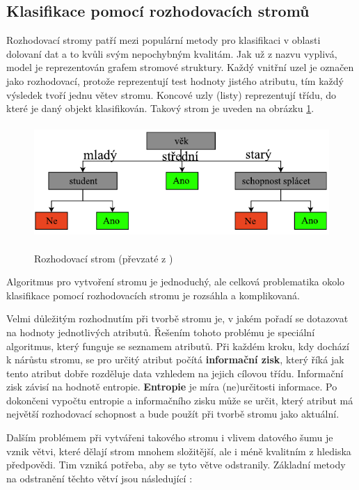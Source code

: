 \subsection*{Klasifikace pomocí rozhodovacích stromů}
Rozhodovací stromy patří mezi populární metody pro klasifikaci v oblasti dolovaní dat a to kvůli svým nepochybným kvalitám. Jak už z nazvu vyplivá, model je reprezentován grafem stromové struktury. Každý vnitřní uzel je označen jako rozhodovací, protože reprezentují test hodnoty jistého atributu, tím každý výsledek tvoří jednu větev stromu. Koncové uzly (listy) reprezentují třídu, do které je daný objekt klasifikován. \cite{Lior} Takový strom je uveden na obrázku \ref{strom_df}.

\begin{figure}[h]\centering
  \centering
  \includegraphics[width=5in,height=1.7in]{obrazky/rozhodovaci-strom.pdf}\\[1pt]
  \caption{Rozhodovací strom (převzaté z \cite{Han})}
  \label{strom_df}
\end{figure}

Algoritmus pro vytvoření stromu je jednoduchý, ale celková problematika okolo klasifikace pomocí rozhodovacích stromu je rozsáhla a komplikovaná.

Velmi důležitým rozhodnutím při tvorbě stromu je, v jakém pořadí se dotazovat na hodnoty jednotlivých atributů. Řešením tohoto problému je speciální algoritmus, který funguje se seznamem atributů. Při každém kroku, kdy dochází k nárůstu stromu, se pro určitý atribut počítá \textbf{informační zisk}, který říká jak tento atribut dobře rozděluje data vzhledem na jejich cílovou třídu. Informační zisk závisí na hodnotě entropie. \textbf{Entropie} je míra (ne)určitosti informace. Po dokončeni vypočtu entropie a informačního zisku může se určit, který atribut má největší rozhodovací schopnost a bude použít při tvorbě stromu jako aktuální. \cite{Dunham}

Dalším problémem při vytvářeni takového stromu i vlivem datového šumu je vznik větvi, které dělají strom mnohem složitější, ale i méně kvalitním z hlediska předpovědi.  Tim vzniká potřeba, aby se tyto větve odstranily. Základní metody na odstranění těchto větví jsou následující \cite{Han}:

